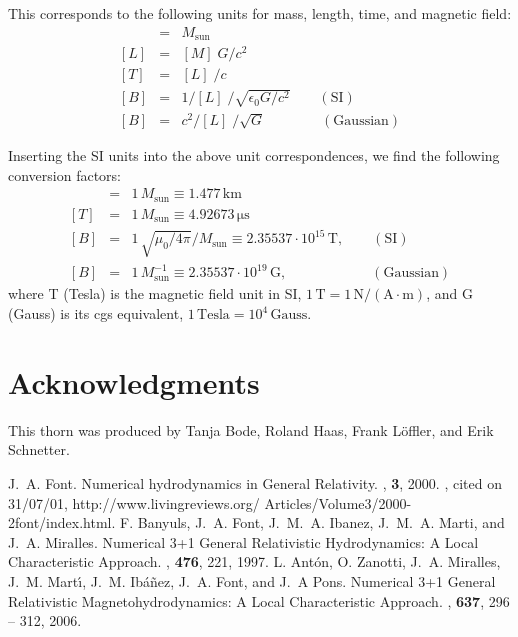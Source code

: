 This corresponds to the following units for mass, length, time, and
magnetic field:
\begin{eqnarray}
  [M] & = & M_{\mathrm{sun}}
  \\{}
  [L] & = & [M]\; G/c^2
  \\{}
  [T] & = & [L]\; / c
  \\{}
  [B] & = & 1/[L]\; / \sqrt{\epsilon_0 G / c^2} \qquad (\mathrm{SI})
  \\{}
  [B] & = & c^2/[L]\; / \sqrt{G} \qquad \qquad (\mathrm{Gaussian})
\end{eqnarray}

Inserting the SI units into the above unit correspondences, 
we find the following conversion factors:
\begin{eqnarray}
  [L] & = & 1\, M_{\mathrm{sun}} \equiv 1.477\, \mathrm{km}
  \\{}
  [T] & = & 1\, M_{\mathrm{sun}} \equiv 4.92673\, \mathrm{\mu s}
  \\{}
  [B] & = & 1\, \sqrt{\mu_0/4\pi} /M_{\mathrm{sun}} \equiv 2.35537\cdot 
            10^{15}\, \mathrm{T},  \qquad (\mathrm{SI})
  \\{}
  [B] & = & 1\, M^{-1}_{\mathrm{sun}} \equiv 2.35537\cdot 10^{19}\, \mathrm{G}, 
            \qquad \qquad \qquad (\mathrm{Gaussian})
\end{eqnarray}
where T (Tesla) is the magnetic field unit in SI, 
$1\,\mathrm{T}=1\,\mathrm{N/(A\cdot m)}$, and G (Gauss) is its cgs equivalent,
$1\,\mathrm{Tesla} = 10^4\,\mathrm{Gauss}$. 


\section{Acknowledgments}

This thorn was produced by Tanja Bode, Roland Haas, Frank L\"offler, and Erik Schnetter.

\begin{thebibliography}{9}
    J.~A. Font.
    \newblock Numerical hydrodynamics in {G}eneral {R}elativity.
    , {\bf 3}, 2000.
    , cited on 31/07/01,
      http://www.livingreviews.org/ Articles/Volume3/2000-2font/index.html.
    F. Banyuls, J.~A. Font, J.~M.~A. Ibanez, J.~M.~A. Marti, and 
	J.~A. Miralles. 
    \newblock Numerical 3+1 General Relativistic Hydrodynamics: A Local Characteristic Approach.
    , {\bf 476}, 221, 1997.
    L. Ant{\'o}n, O. Zanotti, J.~A. Miralles,  
	J.~M. Mart{\'{\i}}, J.~M. Ib{\'a}{\~n}ez, J.~A. Font, and 
	 J.~A Pons.
    \newblock Numerical 3+1 General Relativistic Magnetohydrodynamics: A Local Characteristic Approach.
    , {\bf 637}, 296 -- 312, 2006.
\end{thebibliography}

